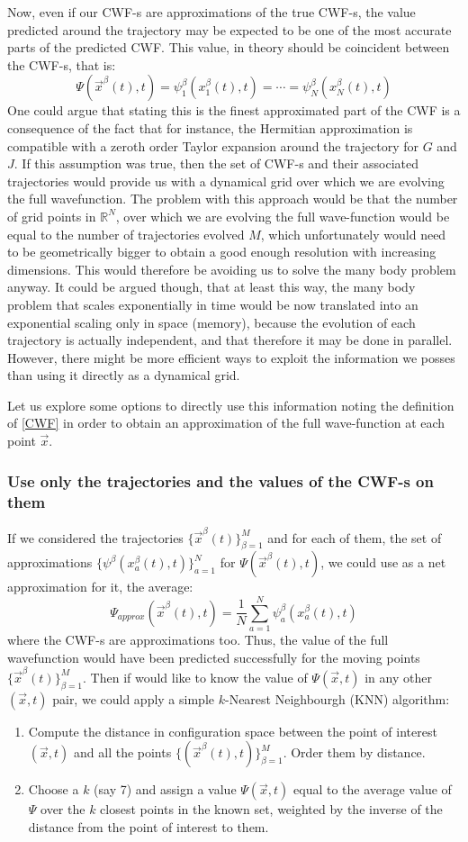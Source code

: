 \documentclass[11pt, a4paper]{article} %
\newcommand{\R}{\mathbb{R}} %
\begin{document}
 Now, even if our CWF-s are approximations of the true CWF-s, the value predicted around the trajectory may be expected to be one of the most accurate parts of the predicted CWF. This value, in theory should be coincident between the CWF-s, that is:
$$\Psi(\vec{x}^\beta(t),t)=\psi^\beta_1(x_1^\beta (t),t)=\cdots=\psi^\beta_N(x_N^\beta (t),t)$$ 
One could argue that stating this is the finest approximated part of the CWF is a consequence of the fact that for instance, the Hermitian approximation is compatible with a zeroth order Taylor expansion around the trajectory for $G$ and $J$. If this assumption was true, then the set of CWF-s and their associated trajectories would provide us with a dynamical grid over which we are evolving the full wavefunction. The problem with this approach would be that the number of grid points in $\R^N$, over which we are evolving the full wave-function would be equal to the number of trajectories evolved $M$, which unfortunately would need to be geometrically bigger to obtain a good enough resolution with increasing dimensions. This would therefore be avoiding us to solve the many body problem anyway. It could be argued though, that at least this way, the many body problem that scales exponentially in time would be now translated into an exponential scaling only in space (memory), because the evolution of each trajectory is actually independent, and that therefore it may be done in parallel. However, there might be more efficient ways to exploit the information we posses than using it directly as a dynamical grid.

Let us explore some options to directly use this information noting the definition of \ref{CWF} in order to obtain an approximation of the full wave-function at each point $\vec{x}$.

\subsubsection{Use only the trajectories and the values of the CWF-s on them}
If we considered the trajectories $\{\vec{x}^\beta(t)\}_{\beta=1}^M$ and for each of them, the set of approximations $\{\psi^\beta(x_a^\beta(t),t) \}_{a=1}^{N}$ for $\Psi(\vec{x}^\beta(t),t)$, we could use as a net approximation for it, the average:
$$
\Psi_{approx}(\vec{x}^\beta(t),t)=\frac{1}{N}\sum_{a=1}^N \psi^\beta_a(x_a^\beta(t),t)
$$
where the CWF-s are approximations too. Thus, the value of the full wavefunction would have been predicted successfully for the moving points $\{ \vec{x}^\beta(t) \}_{\beta=1}^M$. Then if would like to know the value of $\Psi(\vec{x},t)$ in any other $(\vec{x},t)$ pair, we could apply a simple $k$-Nearest Neighbourgh (KNN) algorithm:
\begin{enumerate}
\item Compute the distance in configuration space between the point of interest $(\vec{x},t)$ and all the points $\{ (\vec{x}^\beta(t),t) \}_{\beta=1}^M$. Order them by distance.
\item Choose a $k$ (say 7) and assign a value $\Psi(\vec{x},t)$ equal to the average value of $\Psi$ over the $k$ closest points in the known set, weighted by the inverse of the distance from the point of interest to them.
\end{enumerate}
\end{document}
